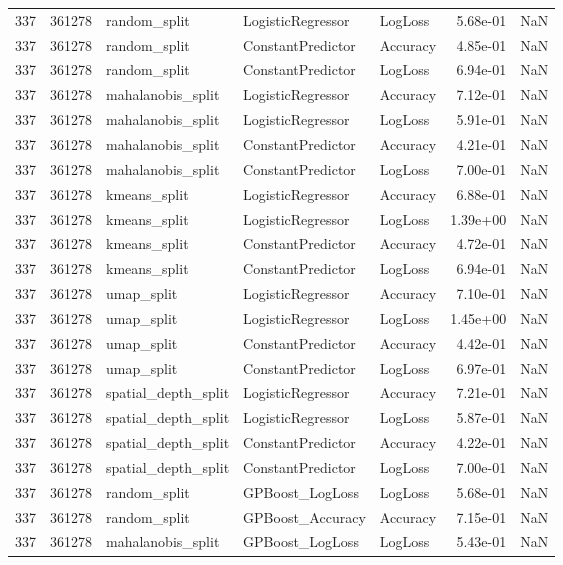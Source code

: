 \begin{tabular}{rrlllrr}
337 & 361278 & random\_split & LogisticRegressor & LogLoss & 5.68e-01 & NaN \\
337 & 361278 & random\_split & ConstantPredictor & Accuracy & 4.85e-01 & NaN \\
337 & 361278 & random\_split & ConstantPredictor & LogLoss & 6.94e-01 & NaN \\
337 & 361278 & mahalanobis\_split & LogisticRegressor & Accuracy & 7.12e-01 & NaN \\
337 & 361278 & mahalanobis\_split & LogisticRegressor & LogLoss & 5.91e-01 & NaN \\
337 & 361278 & mahalanobis\_split & ConstantPredictor & Accuracy & 4.21e-01 & NaN \\
337 & 361278 & mahalanobis\_split & ConstantPredictor & LogLoss & 7.00e-01 & NaN \\
337 & 361278 & kmeans\_split & LogisticRegressor & Accuracy & 6.88e-01 & NaN \\
337 & 361278 & kmeans\_split & LogisticRegressor & LogLoss & 1.39e+00 & NaN \\
337 & 361278 & kmeans\_split & ConstantPredictor & Accuracy & 4.72e-01 & NaN \\
337 & 361278 & kmeans\_split & ConstantPredictor & LogLoss & 6.94e-01 & NaN \\
337 & 361278 & umap\_split & LogisticRegressor & Accuracy & 7.10e-01 & NaN \\
337 & 361278 & umap\_split & LogisticRegressor & LogLoss & 1.45e+00 & NaN \\
337 & 361278 & umap\_split & ConstantPredictor & Accuracy & 4.42e-01 & NaN \\
337 & 361278 & umap\_split & ConstantPredictor & LogLoss & 6.97e-01 & NaN \\
337 & 361278 & spatial\_depth\_split & LogisticRegressor & Accuracy & 7.21e-01 & NaN \\
337 & 361278 & spatial\_depth\_split & LogisticRegressor & LogLoss & 5.87e-01 & NaN \\
337 & 361278 & spatial\_depth\_split & ConstantPredictor & Accuracy & 4.22e-01 & NaN \\
337 & 361278 & spatial\_depth\_split & ConstantPredictor & LogLoss & 7.00e-01 & NaN \\
337 & 361278 & random\_split & GPBoost\_LogLoss & LogLoss & 5.68e-01 & NaN \\
337 & 361278 & random\_split & GPBoost\_Accuracy & Accuracy & 7.15e-01 & NaN \\
337 & 361278 & mahalanobis\_split & GPBoost\_LogLoss & LogLoss & 5.43e-01 & NaN \\

\end{tabular}
